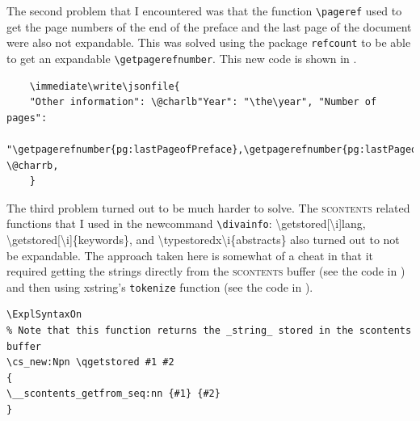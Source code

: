The second problem that I encountered was that the function \texttt{\textbackslash pageref} used to get the page numbers of the end of the preface and the last page of the document were also not expandable. This was solved using the package \texttt{refcount} to be able to get an expandable \texttt{\textbackslash getpagerefnumber}. This new code is shown in .
\begin{lstlisting}[language={[LaTeX]TeX}, caption={New code to output the "Other information" including page numbers}, label=lst:newCodeToOutputPageNumbers]
    % "\pageref{pg:lastPageofPreface},\pageref{pg:lastPageofMainmatter}" \@charrb,
    \immediate\write\jsonfile{
    "Other information": \@charlb"Year": "\the\year", "Number of pages": 
    "\getpagerefnumber{pg:lastPageofPreface},\getpagerefnumber{pg:lastPageofMainmatter}" \@charrb,
    }
\end{lstlisting}

The third problem turned out to be much harder to solve. The \textsc{scontents} related functions that I used in the newcommand \texttt{\textbackslash divainfo}: \textbackslash getstored[\textbackslash i]{lang}, \textbackslash getstored[\textbackslash i]\{keywords\}, and \textbackslash typestoredx{\textbackslash i}\{abstracts\} also turned out to not be expandable. The approach taken here is somewhat of a cheat in that it required getting the strings directly from the \textsc{scontents} buffer (see the code in ) and then using xstring’s \texttt{tokenize}  function (see the code in ).
\begin{lstlisting}[language={[LaTeX]TeX}, caption={Function to get the scontents}, label=lst:functionToGetscontents]
\ExplSyntaxOn
% Note that this function returns the _string_ stored in the scontents buffer
\cs_new:Npn \qgetstored #1 #2
{
\__scontents_getfrom_seq:nn {#1} {#2}
}
\end{lstlisting}
	
